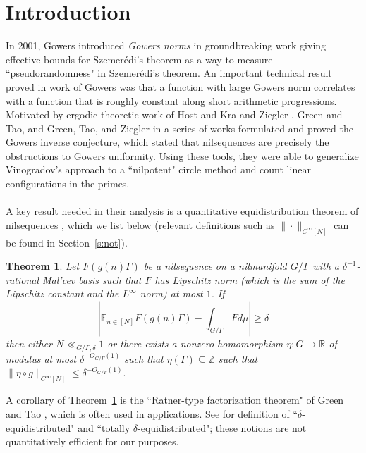 \documentclass[11pt, a4paper]{amsart}
\theoremstyle{plain}
\theoremstyle{plain}
\newtheorem{theorem}{Theorem}
\theoremstyle{definition}
\theoremstyle{remark}
\numberwithin{equation}{section}
\numberwithin{lemma}{section}
\numberwithin{proposition}{section}
\numberwithin{corollary}{section}
\numberwithin{definition}{section}
\numberwithin{claim}{section}
\begin{document}
\section{Introduction}
In 2001, Gowers \cite{Gow98, Gow01a} introduced \emph{Gowers norms} in groundbreaking work giving effective bounds for Szemer\'edi's theorem as a way to measure ``pseudorandomness" in Szemer\'edi's theorem. An important technical result proved in work of Gowers was that a function with large Gowers norm correlates with a function that is roughly constant along short arithmetic progressions. Motivated by ergodic theoretic work of Host and Kra \cite{HK05} and Ziegler \cite{Zie07}, Green and Tao, and Green, Tao, and Ziegler in a series of works \cite{GT12, GT10, GT12c, GTZ12, GTZ11} formulated and proved the Gowers inverse conjecture, which stated that nilsequences are precisely the obstructions to Gowers uniformity. Using these tools, they were able to generalize Vinogradov's approach to a ``nilpotent" circle method and count linear configurations in the primes. \\\\
A key result needed in their analysis is a quantitative equidistribution theorem of nilsequences \cite[Theorem 1.16]{GT12}, which we list below (relevant definitions such as $\|\cdot \|_{C^\infty[N]}$ can be found in Section~\ref{s:not}).
\begin{theorem}\label{t:GreenTao}
Let $F(g(n)\Gamma)$ be a nilsequence on a nilmanifold $G/\Gamma$ with a $\delta^{-1}$-rational Mal'cev basis such that $F$ has Lipschitz norm (which is the sum of the Lipschitz constant and the $L^\infty$ norm) at most $1$. If 
$$\left|\mathbb{E}_{n \in [N]} F(g(n)\Gamma) - \int_{G/\Gamma} F d\mu\right| \ge \delta$$
then either $N \ll_{G/\Gamma, \delta} 1$ or there exists a nonzero homomorphism $\eta: G \to \mathbb{R}$ of modulus at most $\delta^{-O_{G/\Gamma}(1)}$ such that $\eta(\Gamma) \subseteq \mathbb{Z}$ such that $\|\eta \circ g\|_{C^\infty[N]} \le \delta^{-O_{G/\Gamma}(1)}.$
\end{theorem}
A corollary of Theorem~\ref{t:GreenTao} is the ``Ratner-type factorization theorem" of Green and Tao \cite[Corollary 1.20]{GT12}, which is often used in applications. See \cite[Definition 1.2]{GT12} for definition of ``$\delta$-equidistributed" and ``totally $\delta$-equidistributed"; these notions are not quantitatively efficient for our purposes.
\end{document}
